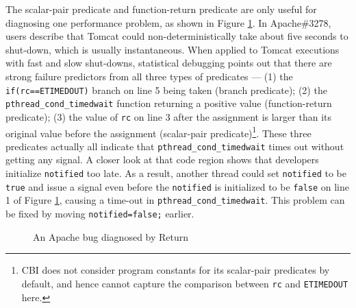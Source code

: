 The scalar-pair predicate and function-return predicate are only useful
for diagnosing one performance problem, as shown in 
Figure \ref{fig:Apache3278}.
In Apache\#3278, users describe that Tomcat could
non-deterministically take about five seconds to shut-down, which is usually
instantaneous. When applied to Tomcat executions
with fast and slow shut-downs, statistical debugging points out that there are
strong failure predictors from all three types of predicates --- 
(1) the \texttt{if(rc==ETIMEDOUT)} branch on line 5 being taken (branch predicate);
(2) the \texttt{pthread\_cond\_timedwait} function returning 
a positive value (function-return predicate);
(3) the value of \texttt{rc} on line 3 after the assignment is larger than its
original value before the assignment 
(scalar-pair predicate)\footnote{CBI does not consider program constants
for its scalar-pair predicates by default, and hence
cannot capture the comparison between \texttt{rc} and \texttt{ETIMEDOUT} here.}.
These three predicates actually all indicate that 
\texttt{pthread\_cond\_timedwait}
times out without getting any signal. 
A closer look at that code region shows that developers initialize
\texttt{notified} too late. 
As a result, another thread
could set \texttt{notified} to be \texttt{true} and issue a signal even
before the \texttt{notified} is initialized to be \texttt{false} on line 1 of
Figure \ref{fig:Apache3278}, causing a time-out in \texttt{pthread\_cond\_timedwait}. 
This problem can be fixed by moving \texttt{notified=false;} earlier.


\begin{figure}
\centering

\caption{An Apache bug diagnosed by Return}
\label{fig:Apache3278}
\end{figure}



